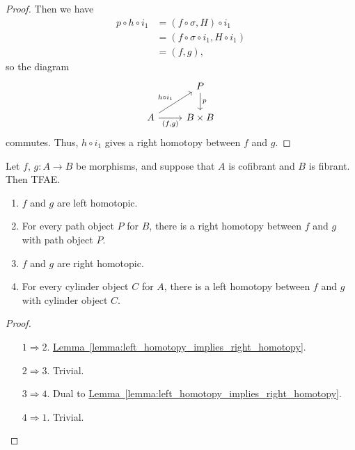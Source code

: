 \documentclass[main.tex]{subfiles}
\begin{document}
\begin{proof}
  Then we have
  \begin{align*}
    p \circ h \circ i_{1} &= (f \circ \sigma, H) \circ i_{1} \\
    &= (f \circ \sigma \circ i_{1}, H \circ i_{1}) \\
    &= (f, g),
  \end{align*}
  so the diagram
  \begin{equation*}
    \begin{tikzcd}
      & P
      \arrow[d, "p"]
      \\
      A
      \arrow[ur, "h \circ i_{1}"]
      \arrow[r, swap, "{(f, g)}"]
      & B \times B
    \end{tikzcd}
  \end{equation*}
  commutes. Thus, $h \circ i_{1}$ gives a right homotopy between $f$ and $g$.
\end{proof}

\begin{corollary}
  Let $f$, $g\colon A \to B$ be morphisms, and suppose that $A$ is cofibrant and $B$ is fibrant. Then TFAE.
  \begin{enumerate}
    \item $f$ and $g$ are left homotopic.

    \item For every path object $P$ for $B$, there is a right homotopy between $f$ and $g$ with path object $P$.

    \item $f$ and $g$ are right homotopic.

    \item For every cylinder object $C$ for $A$, there is a left homotopy between $f$ and $g$ with cylinder object $C$.
  \end{enumerate}
\end{corollary}
\begin{proof}
  \leavevmode
  \begin{itemize}
    \item[$1 \Rightarrow 2$.] \hyperref[lemma:left_homotopy_implies_right_homotopy]{Lemma~\ref*{lemma:left_homotopy_implies_right_homotopy}}.

    \item[$2 \Rightarrow 3$.] Trivial.

    \item[$3 \Rightarrow 4$.] Dual to \hyperref[lemma:left_homotopy_implies_right_homotopy]{Lemma~\ref*{lemma:left_homotopy_implies_right_homotopy}}.

    \item[$4 \Rightarrow 1$.] Trivial.
  \end{itemize}
\end{proof}
\end{document}
